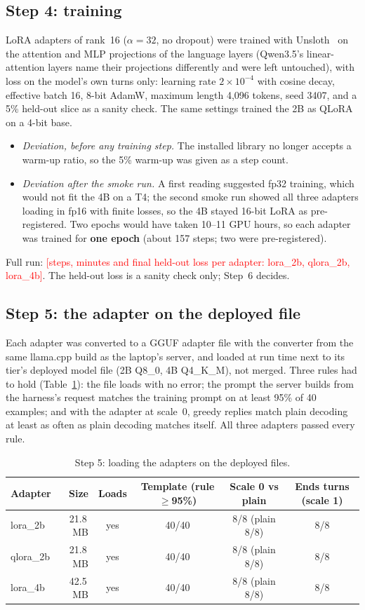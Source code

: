 \documentclass[11pt,a4paper]{article}
\newcommand{\placeholder}[1]{\textcolor{red}{[#1]}}
\begin{document}
\subsection{Step 4: training}
LoRA adapters of rank~16 ($\alpha = 32$, no dropout) were trained with Unsloth~\cite{unsloth} on the attention and MLP
projections of the language layers (Qwen3.5's linear-attention layers name their projections differently and were left
untouched), with loss on the model's own turns only: learning rate $2\times10^{-4}$ with cosine decay, effective batch 16,
8-bit AdamW, maximum length 4,096 tokens, seed 3407, and a 5\% held-out slice as a sanity check. The same settings trained
the 2B as QLoRA on a 4-bit base.
\begin{itemize}
  \item \emph{Deviation, before any training step.} The installed library no longer accepts a warm-up ratio, so the 5\%
        warm-up was given as a step count.
  \item \emph{Deviation after the smoke run.} A first reading suggested fp32 training, which would not fit the 4B on a
        T4; the second smoke run showed all three adapters loading in fp16 with finite losses, so the 4B stayed 16-bit
        LoRA as pre-registered. Two epochs would have taken 10--11 GPU hours, so each adapter was trained for
        \textbf{one epoch} (about 157 steps; two were pre-registered).
\end{itemize}
Full run: \placeholder{steps, minutes and final held-out loss per adapter: lora\_2b, qlora\_2b, lora\_4b}. The held-out
loss is a sanity check only; Step~6 decides.

\subsection{Step 5: the adapter on the deployed file}
Each adapter was converted to a GGUF adapter file with the converter from the same llama.cpp build as the laptop's server,
and loaded at run time next to its tier's deployed model file (2B Q8\_0, 4B Q4\_K\_M), not merged. Three rules had to hold
(Table~\ref{tab:step5}): the file loads with no error; the prompt the server builds from the harness's request matches the
training prompt on at least 95\% of 40 examples; and with the adapter at scale~0, greedy replies match plain decoding at least
as often as plain decoding matches itself. All three adapters passed every rule.

\begin{table}[H]
\centering\small
\caption{Step 5: loading the adapters on the deployed files.}\label{tab:step5}
\begin{tabular}{lrcccc}
\toprule
Adapter & Size & Loads & Template (rule $\ge$95\%) & Scale 0 vs plain & Ends turns (scale 1) \\
\midrule
lora\_2b & 21.8\,MB & yes & 40/40 & 8/8 (plain 8/8) & 8/8 \\
qlora\_2b & 21.8\,MB & yes & 40/40 & 8/8 (plain 8/8) & 8/8 \\
lora\_4b & 42.5\,MB & yes & 40/40 & 8/8 (plain 8/8) & 8/8 \\
\bottomrule
\end{tabular}
\end{table}
\end{document}
